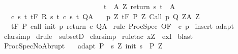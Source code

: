 \begin{isabellebody}
\ \ \ \ \ \ \ \ \ \ \ \ \ \ \ \ \ \ \ \ \ \ \ \ \ \ \ \ \ {\isacharparenleft}{\isasymforall}t\ {\isasymin}\ A{\isacharprime}\ Z{\isachardot}\ return\ s\ t\ {\isasymin}\ A{\isacharparenright}{\isacharbraceright}{\isachardoublequoteclose}\isanewline
\ \ \ c{\isacharcolon}\ {\isachardoublequoteopen}{\isasymforall}s\ t{\isachardot}\ {\isasymGamma}{\isacharcomma}{\isasymTheta}{\isasymturnstile}\isactrlsub t\isactrlbsub {\isacharslash}F\isactrlesub \ {\isacharparenleft}R\ s\ t{\isacharparenright}\ {\isacharparenleft}c\ s\ t{\isacharparenright}\ Q{\isacharcomma}A{\isachardoublequoteclose}\isanewline
\ \ \ p{\isacharcolon}\ {\isachardoublequoteopen}{\isasymforall}Z{\isachardot}\ {\isasymGamma}{\isacharcomma}{\isasymTheta}{\isasymturnstile}\isactrlsub t\isactrlbsub {\isacharslash}F\isactrlesub \ {\isacharparenleft}P{\isacharprime}\ Z{\isacharparenright}\ Call\ p\ {\isacharparenleft}Q{\isacharprime}\ Z{\isacharparenright}{\isacharcomma}{\isacharparenleft}A{\isacharprime}\ Z{\isacharparenright}{\isachardoublequoteclose}\ \isanewline
\ \ \ {\isachardoublequoteopen}{\isasymGamma}{\isacharcomma}{\isasymTheta}{\isasymturnstile}\isactrlsub t\isactrlbsub {\isacharslash}F\isactrlesub \ P\ {\isacharparenleft}call\ init\ p\ return\ c{\isacharparenright}\ Q{\isacharcomma}A{\isachardoublequoteclose}\isanewline
%
\isadelimproof
%
\endisadelimproof
%
\isatagproof
{}\isamarkupfalse%
\ {\isacharparenleft}rule\ ProcSpec\ {\isacharbrackleft}OF\ {\isacharunderscore}\ c\ p{\isacharbrackright}{\isacharparenright}\isanewline
{}\isamarkupfalse%
\ {\isacharparenleft}insert\ adapt{\isacharparenright}\isanewline
{}\isamarkupfalse%
\ clarsimp\isanewline
{}\isamarkupfalse%
\ {\isacharparenleft}drule\ {\isacharparenleft}{}{\isacharparenright}\ subsetD{\isacharparenright}\isanewline
{}\isamarkupfalse%
\ {\isacharparenleft}clarsimp{\isacharparenright}\isanewline
{}\isamarkupfalse%
\ {\isacharparenleft}rule{\isacharunderscore}tac\ x{\isacharequal}Z\ \ exI{\isacharparenright}\isanewline
{}\isamarkupfalse%
\ blast\isanewline
{}\isamarkupfalse%
%
\endisatagproof
{\isafoldproof}%
%
\isadelimproof
\isanewline
%
\endisadelimproof
\isanewline
\isanewline
{}\isamarkupfalse%
\ ProcSpecNoAbrupt{\isacharcolon}\isanewline
\ \ \ adapt{\isacharcolon}\ {\isachardoublequoteopen}P\ {\isasymsubseteq}\ {\isacharbraceleft}s{\isachardot}\ {\isasymexists}Z{\isachardot}\ init\ s\ {\isasymin}\ P{\isacharprime}\ Z\ {\isasymand}\ \isanewline

\end{isabellebody}
